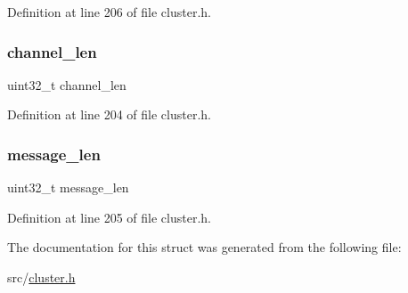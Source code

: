Definition at line 206 of file cluster.\+h.

\mbox{\label{structcluster_msg_data_publish_a68bdef8eb0f6ccd540668a828d29492a}} 
\subsubsection{\texorpdfstring{channel\+\_\+len}{channel\_len}}
{\footnotesize\ttfamily uint32\+\_\+t channel\+\_\+len}



Definition at line 204 of file cluster.\+h.

\mbox{\label{structcluster_msg_data_publish_a619a2b4c8e952645f4d7aa4b229fe3d9}} 
\subsubsection{\texorpdfstring{message\+\_\+len}{message\_len}}
{\footnotesize\ttfamily uint32\+\_\+t message\+\_\+len}



Definition at line 205 of file cluster.\+h.



The documentation for this struct was generated from the following file\+:\begin{DoxyCompactItemize}
\item 
src/\hyperlink{cluster_8h}{cluster.\+h}\end{DoxyCompactItemize}
